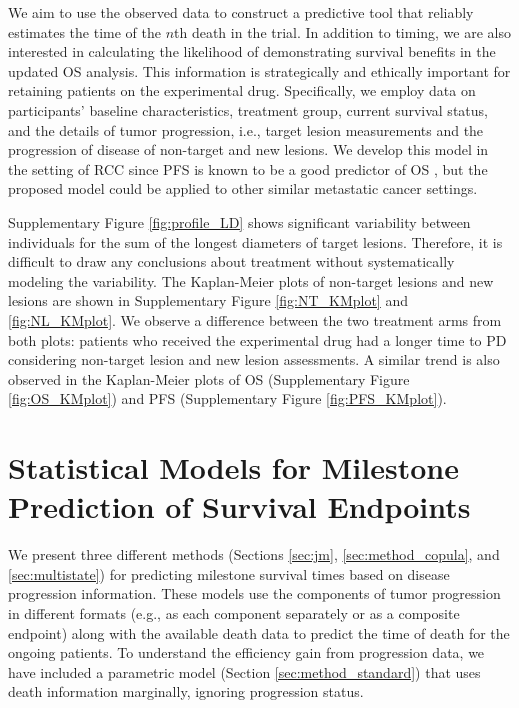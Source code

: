\documentclass[aoas]{imsart}
\theoremstyle{plain}
\theoremstyle{remark}
\begin{document}
We aim to use the observed data to construct a predictive tool that reliably estimates the time of the $n$th death in the trial. In addition to timing, we are also interested in calculating the likelihood of demonstrating survival benefits in the updated OS analysis. This information is strategically and ethically important for retaining patients on the experimental drug. Specifically, we employ data on participants' baseline characteristics, treatment group, current survival status, and the details of tumor progression, i.e., target lesion measurements and the progression of disease of non-target and new lesions. We develop this model in the setting of RCC since PFS is known to be a good predictor of OS \citep{heng2011progression}, but the proposed model could be applied to other similar metastatic cancer settings.

Supplementary Figure \ref{fig:profile_LD} shows significant variability between individuals for the sum of the longest diameters of target lesions. Therefore, it is difficult to draw any conclusions about treatment without systematically modeling the variability. The Kaplan-Meier plots of non-target lesions and new lesions are shown in Supplementary Figure \ref{fig:NT_KMplot} and \ref{fig:NL_KMplot}. We observe a difference between the two treatment arms from both plots: patients who received the experimental drug had a longer time to PD considering non-target lesion and new lesion assessments. A similar trend is also observed in the Kaplan-Meier plots of OS (Supplementary Figure \ref{fig:OS_KMplot}) and PFS (Supplementary Figure \ref{fig:PFS_KMplot}). 

\section{Statistical Models for Milestone Prediction of Survival Endpoints}
\label{sec:method}

We present three different methods (Sections \ref{sec:jm}, \ref{sec:method_copula}, and \ref{sec:multistate}) for predicting milestone survival times based on disease progression information. These models use the components of tumor progression in different formats (e.g., as each component separately or as a composite endpoint) along with the available death data to predict the time of death for the ongoing patients. To understand the efficiency gain from progression data, we have included a parametric model (Section \ref{sec:method_standard}) that uses death information marginally, ignoring progression status. 
\end{document}
